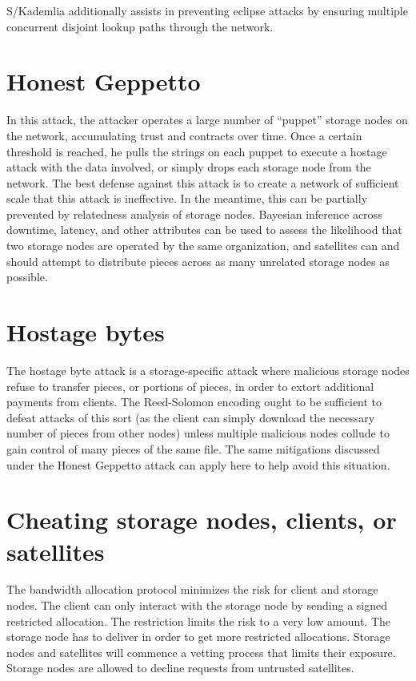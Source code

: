 \documentclass[11pt,fleqn,openany]{book}
\begin{document}
S/Kademlia additionally assists in preventing eclipse attacks by ensuring
multiple concurrent disjoint lookup paths through the network.

\section{Honest Geppetto}

In this attack,
the attacker operates a large number of ``puppet'' storage nodes on the network,
accumulating trust and contracts over time. Once a certain threshold is reached,
he pulls the strings on each puppet to execute a hostage attack with the data
involved, or simply drops each storage node from the network. The best defense
against this attack is to create a network of sufficient scale that this attack
is ineffective. In the meantime, this can be partially prevented by relatedness
analysis of storage nodes. Bayesian inference across downtime, latency, and other
attributes can be used to assess the likelihood that two storage nodes are
operated by the same organization, and satellites can and should attempt to
distribute pieces across as many unrelated storage nodes as possible.

\section{Hostage bytes}

The hostage byte attack is a storage-specific attack where malicious storage
nodes
refuse to transfer pieces, or portions of pieces, in order to extort additional
payments from clients. The Reed-Solomon encoding ought to be sufficient to
defeat attacks of this sort (as the client can simply download the necessary
number of pieces from other nodes) unless multiple malicious nodes collude to
gain control of many pieces of the same file. The same mitigations discussed
under the Honest Geppetto attack can apply here to help avoid this situation.

\section{Cheating storage nodes, clients, or satellites}

The bandwidth allocation protocol minimizes the risk for client and storage
nodes.
The client can only interact with the storage node by sending a signed
restricted allocation.
The restriction limits the risk to a very low amount.
The storage node has to deliver in order to get more restricted allocations.
Storage nodes and satellites will commence a vetting process that limits their
exposure.
Storage nodes are allowed to decline requests from untrusted satellites.
\end{document}
